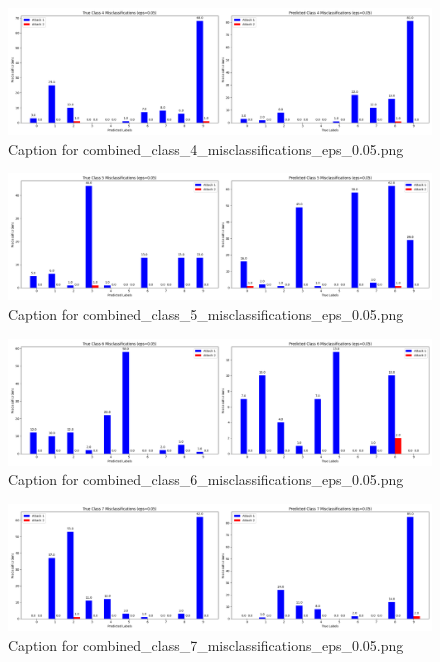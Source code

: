 \documentclass[11pt,onside]{article}
\begin{document}
\begin{figure}[ht]
\centering
\includegraphics[width=1\textwidth]{combined_class_boundary_pgd/combined_class_4_misclassifications_eps_0.05.png}
\caption{Caption for combined_class_4_misclassifications_eps_0.05.png}
\label{fig:combined_class_4_misclassifications_eps_0.05.png}
\end{figure}

\begin{figure}[ht]
\centering
\includegraphics[width=1\textwidth]{combined_class_boundary_pgd/combined_class_5_misclassifications_eps_0.05.png}
\caption{Caption for combined_class_5_misclassifications_eps_0.05.png}
\label{fig:combined_class_5_misclassifications_eps_0.05.png}
\end{figure}

\begin{figure}[ht]
\centering
\includegraphics[width=1\textwidth]{combined_class_boundary_pgd/combined_class_6_misclassifications_eps_0.05.png}
\caption{Caption for combined_class_6_misclassifications_eps_0.05.png}
\label{fig:combined_class_6_misclassifications_eps_0.05.png}
\end{figure}

\begin{figure}[ht]
\centering
\includegraphics[width=1\textwidth]{combined_class_boundary_pgd/combined_class_7_misclassifications_eps_0.05.png}
\caption{Caption for combined_class_7_misclassifications_eps_0.05.png}
\label{fig:combined_class_7_misclassifications_eps_0.05.png}
\end{figure}
\end{document}
